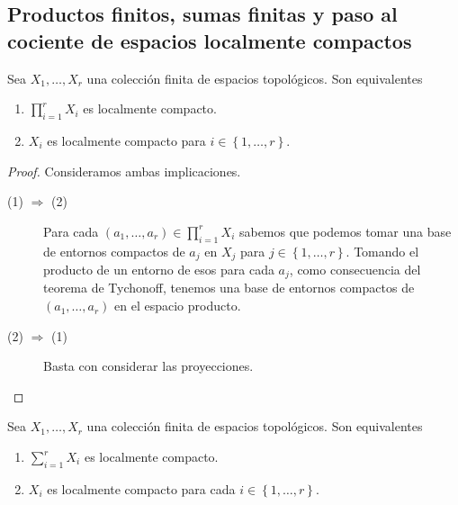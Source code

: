 \subsection{Productos finitos, sumas finitas y paso al cociente de espacios localmente compactos}
\begin{prop}
Sea $\displaystyle X_{1}, \ldots, X_{r} $ una colección finita de espacios topológicos. Son equivalentes
\begin{enumerate}
\item $\displaystyle \prod^{r}_{i = 1}X_{i} $ es localmente compacto.
\item $\displaystyle X_{i} $ es localmente compacto para $\displaystyle i \in \left\{ 1, \ldots, r\right\}  $.
\end{enumerate}
\end{prop}
\begin{proof}
Consideramos ambas implicaciones.
\begin{description}
	\item[(1) $\displaystyle \Rightarrow $ (2)] Para cada $\displaystyle \left(a_{1}, \ldots, a_{r}\right)\in \prod^{r}_{i = 1}X_{i} $ sabemos que podemos tomar una base de entornos compactos de $\displaystyle a_{j} $ en $\displaystyle X_{j} $ para $\displaystyle j \in \left\{ 1, \ldots, r\right\}  $. Tomando el producto de un entorno de esos para cada $\displaystyle a_{j} $, como consecuencia del teorema de Tychonoff, tenemos una base de entornos compactos de $\displaystyle \left(a_{1}, \ldots, a_{r}\right) $ en el espacio producto.
	\item[(2) $\displaystyle \Rightarrow $ (1)] Basta con considerar las proyecciones.
\end{description}
\end{proof}
\begin{prop}
Sea $\displaystyle X_{1}, \ldots, X_{r} $ una colección finita de espacios topológicos. Son equivalentes
\begin{enumerate}
\item $\displaystyle \sum^{r}_{i = 1}X_{i} $ es localmente compacto.
\item $\displaystyle X_{i} $ es localmente compacto para cada $\displaystyle i \in \left\{ 1, \ldots, r\right\}  $. 
\end{enumerate}
\end{prop}
